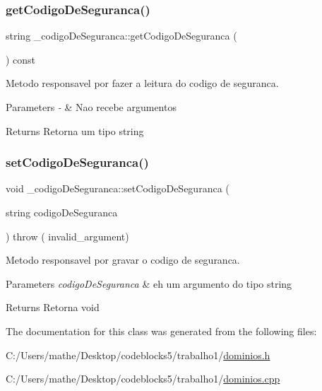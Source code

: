 \subsubsection{\texorpdfstring{getCodigoDeSeguranca()}{getCodigoDeSeguranca()}}
{\footnotesize\ttfamily string \+\_\+codigo\+De\+Seguranca\+::get\+Codigo\+De\+Seguranca (\begin{DoxyParamCaption}{ }\end{DoxyParamCaption}) const\hspace{0.3cm}{\ttfamily [inline]}}



Metodo responsavel por fazer a leitura do codigo de seguranca. 


\begin{DoxyParams}{Parameters}
{\em -\/} & Nao recebe argumentos \\
\hline
\end{DoxyParams}
\begin{DoxyReturn}{Returns}
Retorna um tipo string 
\end{DoxyReturn}
\mbox{\label{class__codigo_de_seguranca_a4c926ed3d3b4153c543431d917b2e9cd}} 
\subsubsection{\texorpdfstring{setCodigoDeSeguranca()}{setCodigoDeSeguranca()}}
{\footnotesize\ttfamily void \+\_\+codigo\+De\+Seguranca\+::set\+Codigo\+De\+Seguranca (\begin{DoxyParamCaption}\item[{string}]{codigo\+De\+Seguranca }\end{DoxyParamCaption}) throw ( invalid\+\_\+argument) }



Metodo responsavel por gravar o codigo de seguranca. 


\begin{DoxyParams}{Parameters}
{\em codigo\+De\+Seguranca} & eh um argumento do tipo string \\
\hline
\end{DoxyParams}
\begin{DoxyReturn}{Returns}
Retorna void 
\end{DoxyReturn}


The documentation for this class was generated from the following files\+:\begin{DoxyCompactItemize}
\item 
C\+:/\+Users/mathe/\+Desktop/codeblocks5/trabalho1/\mbox{\hyperlink{dominios_8h}{dominios.\+h}}\item 
C\+:/\+Users/mathe/\+Desktop/codeblocks5/trabalho1/\mbox{\hyperlink{dominios_8cpp}{dominios.\+cpp}}\end{DoxyCompactItemize}
